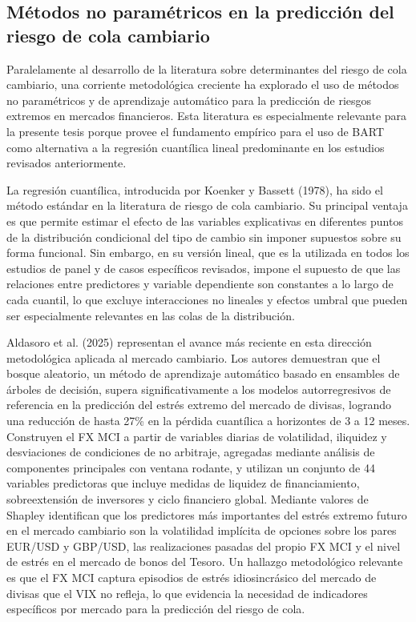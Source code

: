 ﻿\documentclass[11pt,a4paper]{article}
\begin{document}
\subsection{Métodos no paramétricos en la predicción del riesgo de cola cambiario}

Paralelamente al desarrollo de la literatura sobre determinantes del riesgo de cola cambiario, una corriente metodológica creciente ha explorado el uso de métodos no paramétricos y de aprendizaje automático para la predicción de riesgos extremos en mercados financieros. Esta literatura es especialmente relevante para la presente tesis porque provee el fundamento empírico para el uso de BART como alternativa a la regresión cuantílica lineal predominante en los estudios revisados anteriormente.


La regresión cuantílica, introducida por Koenker y Bassett (1978), ha sido el método estándar en la literatura de riesgo de cola cambiario. Su principal ventaja es que permite estimar el efecto de las variables explicativas en diferentes puntos de la distribución condicional del tipo de cambio sin imponer supuestos sobre su forma funcional. Sin embargo, en su versión lineal, que es la utilizada en todos los estudios de panel y de casos específicos revisados, impone el supuesto de que las relaciones entre predictores y variable dependiente son constantes a lo largo de cada cuantil, lo que excluye interacciones no lineales y efectos umbral que pueden ser especialmente relevantes en las colas de la distribución.


Aldasoro et al. (2025) representan el avance más reciente en esta dirección metodológica aplicada al mercado cambiario. Los autores demuestran que el bosque aleatorio, un método de aprendizaje automático basado en ensambles de árboles de decisión, supera significativamente a los modelos autorregresivos de referencia en la predicción del estrés extremo del mercado de divisas, logrando una reducción de hasta 27\% en la pérdida cuantílica a horizontes de 3 a 12 meses. Construyen el FX MCI a partir de variables diarias de volatilidad, iliquidez y desviaciones de condiciones de no arbitraje, agregadas mediante análisis de componentes principales con ventana rodante, y utilizan un conjunto de 44 variables predictoras que incluye medidas de liquidez de financiamiento, sobreextensión de inversores y ciclo financiero global. Mediante valores de Shapley identifican que los predictores más importantes del estrés extremo futuro en el mercado cambiario son la volatilidad implícita de opciones sobre los pares EUR/USD y GBP/USD, las realizaciones pasadas del propio FX MCI y el nivel de estrés en el mercado de bonos del Tesoro. Un hallazgo metodológico relevante es que el FX MCI captura episodios de estrés idiosincrásico del mercado de divisas que el VIX no refleja, lo que evidencia la necesidad de indicadores específicos por mercado para la predicción del riesgo de cola.
\end{document}
